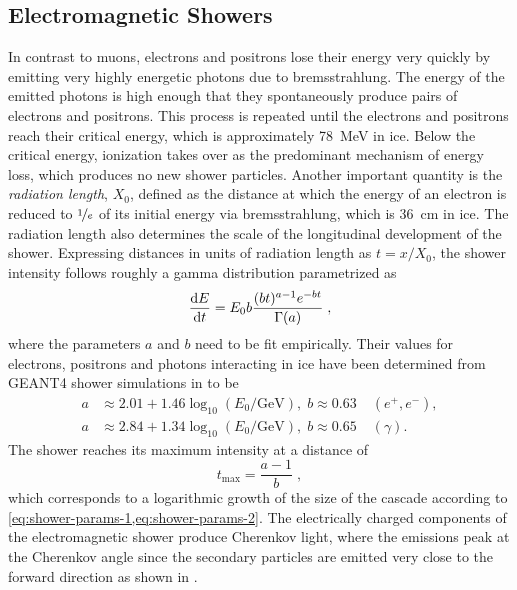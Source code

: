 \subsection{Electromagnetic Showers}
\label{sec:em-showers}
In contrast to muons, electrons and positrons lose their energy very quickly by emitting very highly energetic photons due to bremsstrahlung.
The energy of the emitted photons is high enough that they spontaneously produce pairs of electrons and positrons.
This process is repeated until the electrons and positrons reach their critical energy, which is approximately 78~MeV in ice.
Below the critical energy, ionization takes over as the predominant mechanism of energy loss, which produces no new shower particles.
Another important quantity is the \emph{radiation length}, $X_0$, defined as the distance at which the energy of an electron is reduced to $\nicefrac{1}{e}$ of its initial energy via bremsstrahlung, which is 36~cm in ice\cite{pdg}.
The radiation length also determines the scale of the longitudinal development of the shower.
Expressing distances in units of radiation length as $t=x/X_0$, the shower intensity follows roughly a gamma distribution parametrized as
\begin{equation}
    \frac{\mathrm{d} E}{\mathrm{d} t} = E_0 b \frac{(bt)^{a-1}e^{-bt}}{\Gamma(a)}\;,
\end{equation}
where the parameters $a$ and $b$ need to be fit empirically\cite{pdg}.
Their values for electrons, positrons and photons interacting in ice have been determined from GEANT4 shower simulations in to be
\begin{subequations}\label{eq:shower-params}
\begin{align}
    a &\approx 2.01 + 1.46 \log_{10}(E_0/\mathrm{GeV}),\; b\approx 0.63\; & (e^+,e^-), \label{eq:shower-params-1}\\
    a &\approx 2.84 + 1.34 \log_{10}(E_0/\mathrm{GeV}),\; b\approx 0.65\; & (\gamma).\label{eq:shower-params-2}
\end{align}
\end{subequations}
The shower reaches its maximum intensity at a distance of
\begin{equation}
    t_{\mathrm{max}}=\frac{a-1}{b}\;,
\end{equation}
which corresponds to a logarithmic growth of the size of the cascade according to \cref{eq:shower-params-1,eq:shower-params-2}.
The electrically charged components of the electromagnetic shower produce Cherenkov light, where the emissions peak at the Cherenkov angle since the secondary particles are emitted very close to the forward direction as shown in .

